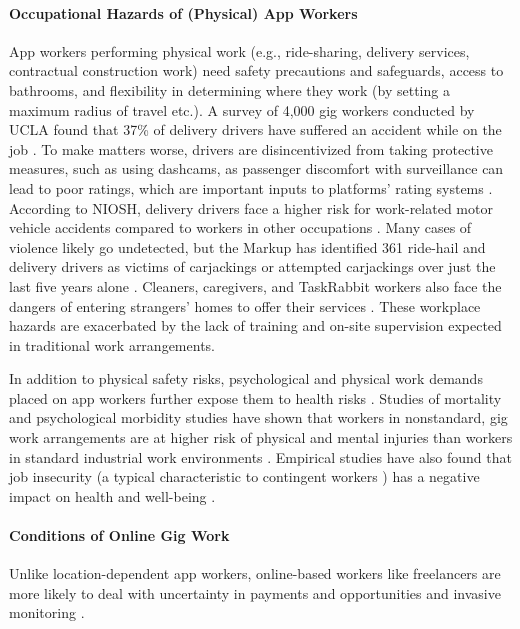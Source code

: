 \paragraph{Occupational Hazards of (Physical) App Workers}
App workers performing physical work (e.g., ride-sharing, delivery services, contractual construction work) need safety precautions and safeguards, access to bathrooms, and flexibility in determining where they work (by setting a maximum radius of travel etc.). A survey of 4,000 gig workers conducted by UCLA found that 37\% of delivery drivers have suffered an accident while on the job \cite{noauthor_undated-is}. To make matters worse, drivers are disincentivized from taking protective measures, such as using dashcams, as passenger discomfort with surveillance can lead to poor ratings, which are important inputs to platforms' rating systems \cite{Almoqbel2019-in}. According to NIOSH, delivery drivers face a higher risk for work-related motor vehicle accidents compared to workers in other occupations \cite{noauthor_1998-ts}. Many cases of violence likely go undetected, but the Markup has identified 361 ride-hail and delivery drivers as victims of carjackings or attempted carjackings over just the last five years alone \cite{Kerr_undated-zw}. Cleaners, caregivers, and TaskRabbit workers also face the dangers of entering strangers' homes to offer their services \cite{Bajwa2018-gy}. These workplace hazards are exacerbated by the lack of training and on-site supervision expected in traditional work arrangements.

In addition to physical safety risks, psychological and physical work demands placed on app workers further expose them to health risks \cite{Keith2020-zb}. Studies of mortality and psychological morbidity studies have shown that workers in nonstandard, gig work arrangements are at higher risk of physical and mental injuries than workers in standard industrial work environments \cite{Howard2017-wd}. Empirical studies have also found that job insecurity (a typical characteristic to contingent workers ) has a negative impact on health and well-being \cite{De_witte2016-wz}.

\paragraph{Conditions of Online Gig Work}
Unlike location-dependent app workers, online-based workers like freelancers are more likely to deal with uncertainty in payments and opportunities \cite{Kitamura2021-gh,making} and invasive monitoring \cite{Popiel2017-wu}. 


